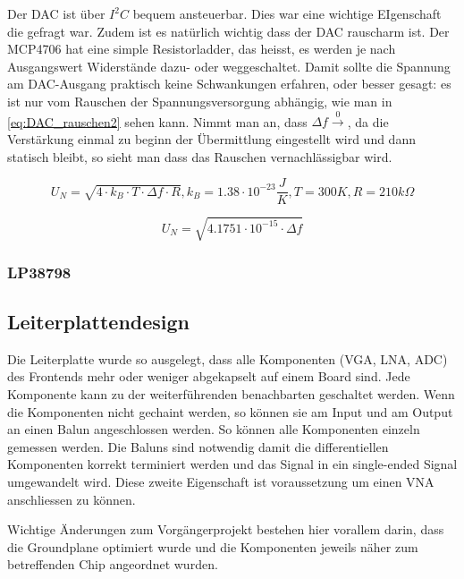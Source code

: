 Der DAC ist über $I^2 C$ bequem ansteuerbar. Dies war eine wichtige EIgenschaft die gefragt war. Zudem ist es natürlich wichtig dass der DAC rauscharm ist. Der MCP4706 hat eine simple Resistorladder, das heisst, es werden je nach Ausgangswert Widerstände dazu- oder weggeschaltet. Damit sollte die Spannung am DAC-Ausgang praktisch keine Schwankungen erfahren, oder besser gesagt: es ist nur vom Rauschen der Spannungsversorgung abhängig, wie man in \ref{eq:DAC_rauschen2} sehen kann. Nimmt man an, dass $\Delta f \xrightarrow 0$, da die Verstärkung einmal zu beginn der Übermittlung eingestellt wird und dann statisch bleibt, so sieht man dass das Rauschen vernachlässigbar wird.

\begin{equation}
    U_N = \sqrt{4 \cdot k_B \cdot T \cdot \Delta f \cdot R}, k_B = 1.38\cdot 10^{-23}\frac{J}{K}, T = 300K, R = 210k\Omega
\label{eq:DAC_rauschen}
\end{equation}

\begin{equation}
    U_N = \sqrt{4.1751\cdot 10^{-15} \cdot \Delta f}
\label{eq:DAC_rauschen2}
\end{equation}

\subsubsection{LP38798}

\subsection{Leiterplattendesign}

Die Leiterplatte wurde so ausgelegt, dass alle Komponenten (VGA, LNA, ADC) des Frontends mehr oder weniger abgekapselt auf einem Board sind. Jede Komponente kann zu der weiterführenden benachbarten geschaltet werden. Wenn die Komponenten nicht gechaint werden, so können sie am Input und am Output an einen Balun angeschlossen werden. So können alle Komponenten einzeln gemessen werden. Die Baluns sind notwendig damit die differentiellen Komponenten korrekt terminiert werden und das Signal in ein single-ended Signal umgewandelt wird. Diese zweite Eigenschaft ist voraussetzung um einen VNA anschliessen zu können.

Wichtige Änderungen zum Vorgängerprojekt bestehen hier vorallem darin, dass die Groundplane optimiert wurde und die Komponenten jeweils näher zum betreffenden Chip angeordnet wurden.

